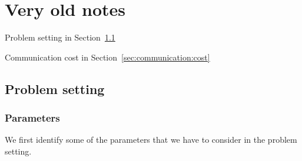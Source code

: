 \section{Very old notes}

Problem setting in Section~\ref{sec:problem:setting}

Communication cost in Section~\ref{sec:communication:cost}

\subsection{Problem setting}\label{sec:problem:setting}

\subsubsection{Parameters}
We first identify some of the parameters that we have to consider in the problem setting.

